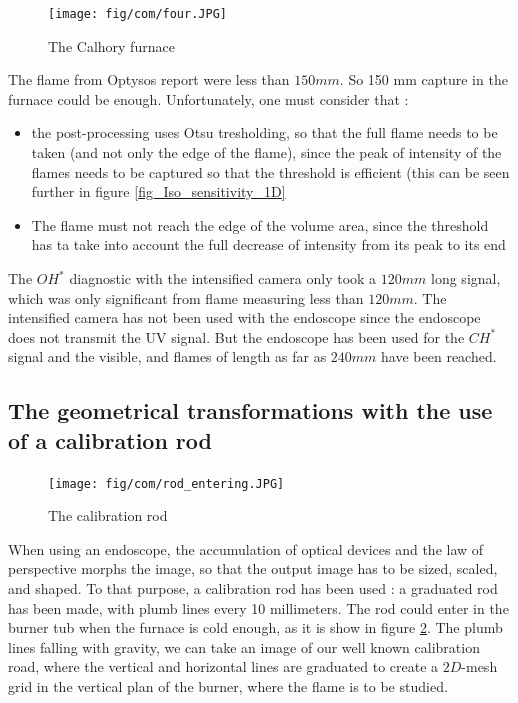  \begin{figure}[!h]
  \centering
\texttt{[image: fig/com/four.JPG]}
  \caption{The Calhory furnace}
 \label{fig_calhory_furnace}
\end{figure}

The flame from Optysos report were less than $150 mm$. So 150 mm capture in the furnace could be enough. Unfortunately, one must consider that :
\begin{itemize}
\item the post-processing uses Otsu tresholding, so that the full flame needs to be taken (and not only the edge of the flame), since the peak of intensity of the flames needs to be captured so that the threshold is efficient (this can be seen further in figure \ref{fig_Iso_sensitivity_1D}
\item The flame must not reach the edge of the volume area, since the threshold has ta take into account the full decrease of intensity from its peak to its end
\end{itemize}
The $OH^*$ diagnostic with the intensified camera only took a $120mm$ long signal, which was only significant from flame measuring less than $120mm$. The intensified camera has not been used with the endoscope since the endoscope does not transmit the UV signal. But the endoscope has been used for the $CH^*$ signal and the visible, and flames of length as far as $240 mm$ have been reached.
\subsection{The geometrical transformations with the use of a calibration rod}


 \begin{figure}[!h]
  \centering
\texttt{[image: fig/com/rod\_entering.JPG]}
  \caption{The calibration rod}
 \label{fig_rod_entering}
\end{figure}

When using an endoscope, the accumulation of optical devices and the law of perspective morphs the image, so that the output image has to be sized, scaled, and shaped. To that purpose, a calibration rod has been used : a graduated rod has been made, with plumb lines every 10 millimeters. The rod could enter in the burner tub when the furnace is cold enough, as it is show in figure \ref{fig_rod_entering}. The plumb lines falling with gravity, we can take an image of our well known calibration road, where the vertical and horizontal lines are graduated to create a $2D$-mesh grid in the vertical plan of the burner, where the flame is to be studied. 

